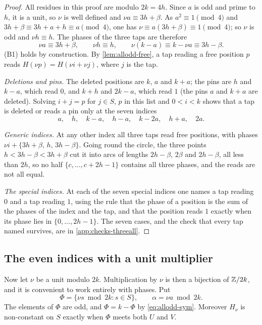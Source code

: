 \begin{proof}
All residues in this proof are modulo $2k=4h$. Since $a$ is odd and prime to
$h$, it is a unit, so $\nu$ is well defined and $\nu a\equiv3h+\beta$. As
$a^2\equiv1\pmod 4$ and $3h+\beta\equiv3h+a+h\equiv a\pmod4$, one has
$\nu\equiv a(3h+\beta)\equiv1\pmod4$; so $\nu$ is odd and $\nu h\equiv h$. The phases
of the three taps are therefore
\[
\nu a\equiv3h+\beta,\qquad \nu h\equiv h,\qquad \nu(k-a)\equiv k-\nu a\equiv3h-\beta .
\]
(B1) holds by construction. By \autoref{lem:allodd-free}, a tap reading a free
position $p$ reads $H(\nu p)=H(\nu i+\nu j)$, where $j$ is the tap.

\emph{Deletions and pins.} The deleted positions are $k$, $a$ and $k+a$; the
pins are $h$ and $k-a$, which read $0$, and $k+h$ and $2k-a$, which read $1$
(the pins $a$ and $k+a$ are deleted). Solving $i+j=p$ for $j\in S$, $p$ in
this list and $0<i<k$ shows that a tap is deleted or reads a pin only at the
seven indices
\[
a,\quad h,\quad k-a,\quad h-a,\quad k-2a,\quad h+a,\quad 2a.
\]

\emph{Generic indices.} At any other index all three taps read free positions,
with phases $\nu i+\{3h+\beta,\,h,\,3h-\beta\}$. Going round the circle, the
three points $h<3h-\beta<3h+\beta$ cut it into arcs of lengths $2h-\beta$,
$2\beta$ and $2h-\beta$, all less than $2h$, so no half
$\{c,\dots,c+2h-1\}$ contains all three phases, and the reads are not all
equal.

\emph{The special indices.} At each of the seven special indices one names
a tap reading $0$ and a tap reading $1$, using the rule that the phase of a
position is the sum of the phases of the index and the tap, and that the
position reads $1$ exactly when its phase lies in $\{0,\dots,2h-1\}$. The
seven cases, and the check that every tap named survives, are in
\autoref{app:checks-threeall}.
\end{proof}

\subsection{The even indices with a unit multiplier}
\label{sec:allodd-even}

Now let $\nu$ be a unit modulo $2k$. Multiplication by $\nu$ is then a bijection
of $\mathbb{Z}/2k$, and it is convenient to work entirely with phases. Put
\[
\Phi=\{\nu s\bmod 2k: s\in S\},\qquad \alpha=\nu a\bmod2k .
\]
The elements of $\Phi$ are odd, and $\Phi=k-\Phi$ by \eqref{eq:allodd-sym}. Moreover
$H_\nu$ is non-constant on $S$ exactly when $\Phi$ meets both $U$ and $V$.

